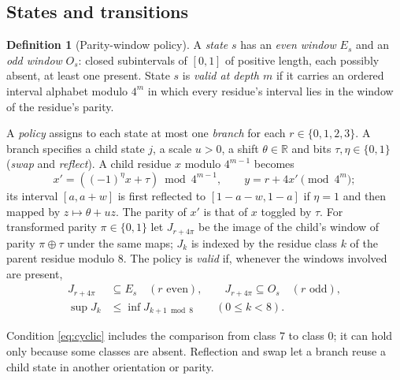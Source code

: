 \documentclass[11pt]{article}
\theoremstyle{definition}
\newtheorem{definition}[theorem]{Definition}
\theoremstyle{remark}
\newcommand{\R}{\mathbb R}
\begin{document}
\subsection{States and transitions}
\begin{definition}[Parity-window policy]\label{def:policy}
A \emph{state} $s$ has an \emph{even window} $E_s$ and an \emph{odd window}
$O_s$: closed subintervals of $[0,1]$ of positive length, each possibly
absent, at least one present. State $s$ is \emph{valid at depth $m$} if it
carries an ordered interval alphabet modulo $4^m$ in which every residue's
interval lies in the window of the residue's parity.

A \emph{policy} assigns to each state at most one \emph{branch} for each
$r\in\{0,1,2,3\}$. A branch specifies a child state $j$, a scale $u>0$, a
shift $\theta\in\R$ and bits $\tau,\eta\in\{0,1\}$ (\emph{swap} and
\emph{reflect}). A child residue $x$ modulo $4^{m-1}$ becomes
\begin{equation}\label{eq:binarydigit}
 x'=((-1)^\eta x+\tau)\bmod 4^{m-1},\qquad y=r+4x'\pmod{4^m};
\end{equation}
its interval $[a,a+w]$ is first reflected to $[1-a-w,1-a]$ if $\eta=1$ and
then mapped by $z\mapsto\theta+uz$. The parity of $x'$ is that of $x$ toggled by
$\tau$. For transformed parity $\pi\in\{0,1\}$ let $J_{r+4\pi}$ be the image
of the child's window of parity $\pi\oplus\tau$ under the same maps; $J_k$ is
indexed by the residue class $k$ of the parent residue modulo $8$. The policy
is \emph{valid} if, whenever the windows involved are present,
\begin{align}
 J_{r+4\pi}&\subseteq E_s\quad(r\text{ even}),\qquad
 J_{r+4\pi}\subseteq O_s\quad(r\text{ odd}),\label{eq:containment}\\
 \sup J_k&\le\inf J_{k+1\bmod8}\qquad(0\le k<8).\label{eq:cyclic}
\end{align}
\end{definition}
Condition \eqref{eq:cyclic} includes the comparison from class $7$ to class
$0$; it can hold only because some classes are absent. Reflection and swap
let a branch reuse a child state in another orientation or parity.
\end{document}
